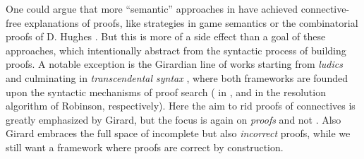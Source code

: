 \begin{scope}
\begin{scope}
\begin{description}
    \begin{digression}
    One could argue that more ``semantic'' approaches in  have
    achieved connective-free explanations of proofs, like strategies in game
    semantics or the combinatorial proofs of D. Hughes
    \cite{heijltjes_intuitionistic_2019}. But this is more of a side effect than
    a goal of these approaches, which intentionally abstract from the syntactic
    process of building proofs. A notable exception is the Girardian line of
    works starting from \emph{ludics} \cite{girard_locus_2001} and culminating
    in \emph{transcendental syntax} \cite{eng_exegesis_2023}, where both
    frameworks are founded upon the syntactic mechanisms of proof search
    ( in , and  in the
    resolution algorithm of Robinson, respectively). Here the aim to rid proofs
    of connectives is greatly emphasized by Girard, but the focus is again on
    \emph{proofs} and not \emph{}. Also Girard embraces the
    full space of incomplete but also \emph{incorrect} proofs, while we still
    want a framework where proofs are correct by construction.
    \end{digression}


\end{description}
\end{scope}
\end{scope}
